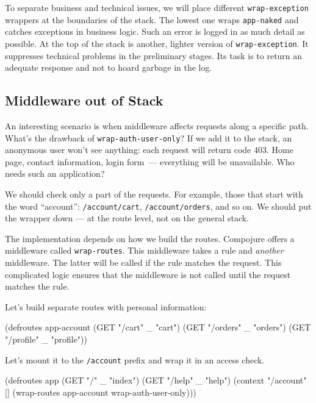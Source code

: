 To separate business and technical issues, we will place different \verb|wrap-exception| wrappers at the boundaries of the stack. The lowest one wraps \verb|app-naked| and catches exceptions in business logic. Such an error is logged in as much detail as possible. At the top of the stack is another, lighter version of \verb|wrap-exception|.
It suppresses technical problems in the preliminary stages. Its task is to return an adequate response and not to hoard garbage in the log.

\subsection{Middleware out of Stack}


An interesting scenario is when middleware affects requests along a specific path. What's the drawback of \verb|wrap-auth-user-only|? If we add it to the stack, an anonymous user won't see anything: each request will return code 403. Home page, contact information, login form~--- everything will be unavailable. Who needs such an application?

We should check only a part of the requests. For example, those that start with the word ``account'': \verb|/account/cart|, \verb|/account/orders|, and so on. We should put the wrapper down — at the route level, not on the general stack.

The implementation depends on how we build the routes. Compojure offers a middleware called \verb|wrap-routes|. This middleware takes a rule and \emph{another} middleware. The latter will be called if the rule matches the request. This complicated logic ensures that the middleware is not called until the request matches the rule.

Let's build separate routes with personal information:

\begin{english}
  \begin{clojure}
(defroutes app-account
  (GET "/cart"    _ "cart")
  (GET "/orders"  _ "orders")
  (GET "/profile" _ "profile"))
  \end{clojure}
\end{english}

\noindent Let's mount it to the \verb|/account| prefix and wrap it in an access check.

\ifx\DEVICETYPE\MOBILE

\begin{english}
  \begin{clojure}
(defroutes app
  (GET "/"     _ "index")
  (GET "/help" _ "help")
  (context "/account" []
    (wrap-routes app-account
                 wrap-auth-user-only)))
  \end{clojure}
\end{english}

